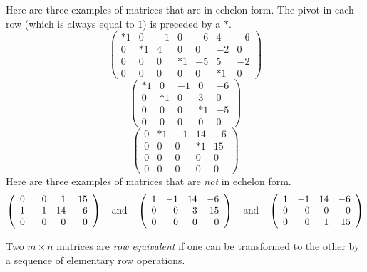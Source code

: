 Here are three examples of matrices that are in echelon form.
The pivot in each row (which is always equal to $1$) is preceded
by a $*$.
\[
\left(\begin{array}{rrrrrrr}
    *1   &  0   &  -1  &  0  &  -6  &   4  &  -6\\
     0   & *1   &  4   &  0  &   0  &  -2  &   0\\
     0   &  0   &  0   & *1  &  -5  &   5  &  -2\\
     0   &  0   &  0   &  0  &   0  &  *1  &   0
\end{array} \right)
\]
\[
\left(\begin{array}{rrrrr}
    *1 &   0  &  -1  &   0  &  -6 \\
     0 &  *1  &   0  &   3  &   0  \\
     0 &   0  &   0  &  *1  &  -5   \\
     0 &   0  &   0  &   0  &   0
\end{array} \right)
\]
\[
\left(\begin{array}{rrrrr}
     0  &  *1  &  -1  &  14  &  -6 \\
     0  &   0  &   0  &  *1  &  15  \\
     0  &   0  &   0  &   0  &   0   \\
     0  &   0  &   0  &   0  &   0
\end{array} \right)
\]
Here are three examples of matrices that are {\em not\/} in echelon form.
\[
\left(\begin{array}{rrrr}
     0  &   0  &   1  &  15  \\
     1  &  -1  &  14  &  -6 \\
     0  &   0  &   0  &   0   \\
\end{array} \right)
\quad\mbox{and}\quad
\left(\begin{array}{rrrr}
     1  &  -1  &  14  &  -6 \\
     0  &   0  &   3  &  15  \\
     0  &   0  &   0  &   0   \\
\end{array} \right)
\quad\mbox{and}\quad
\left(\begin{array}{rrrr}
     1  &  -1  &  14  &  -6 \\
     0  &   0  &   0  &   0   \\
     0  &   0  &   1  &  15  \\
\end{array} \right)
\]


\begin{Def} \label{D:roweq}
Two $m\times n$ matrices are {\em row equivalent\/} if one can be
transformed to the other by a sequence of elementary row
operations.
\end{Def}

